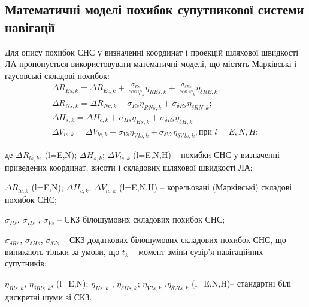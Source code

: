 \subsection{Математичні моделі похибок супутникової системи навігації}

Для опису  похибок СНС у визначенні координат і проекцій шляхової швидкості ЛА пропонується 
використовувати математичні моделі, що містять  Марківські і гаусовські складові 
похибок:
\begin{equation} \label{eq:sns_errors} 
\begin{array}{l} 
{\Delta R_{Es,k} =\Delta R_{Ec,k} +\frac{\sigma_{Rs} }{\cos \varphi_{k} } \eta_{REs,k} +\frac{\sigma_{\delta Rs} }{\cos \varphi_{k} } \eta_{\delta RE,k} ;} \\ 
{\Delta R_{Ns,k} =\Delta R_{Nc,k} +\sigma_{Rs} \eta_{RNs,k} +\sigma_{\delta Rs} \eta_{\delta RN,k} ;} \\ 
{\Delta H_{s,k} =\Delta H_{c,k} +\sigma_{Hs} \eta_{Hs,k} +\sigma_{\delta Rs} \eta_{\delta H,k} }\\ 
{\Delta V_{ls,k} =\Delta V_{lc,k} +\sigma_{Vs} \eta_{V\, ls,k} +\sigma_{\delta Vs} \eta_{\delta V\, ls,k}, \text{при } l=E,N,H;} 
\end{array} \end{equation} 

\begin{ESKDexplanation}
\item де $\Delta R_{ls,k}$, (l=E,N); $\Delta H_{s,k}$; $\Delta V_{ls,k}$ 
 (l=E,N,H) -- похибки СНС у визначенні приведених  координат, висоти і складових 
шляхової швидкості ЛА;
\item $\Delta R_{lc,k}$ (l=E,N);  $\Delta H_{c,k}$; $\Delta V_{lc,k}$ 
 (l=E,N,H) -- корельовані (Марківські) складові  похибок СНС;
\item $\sigma_{Rs} $, $\sigma_{Hs}$ , $\sigma_{Vs}$  --  СКЗ білошумових складових 
похибок СНС;
\item $\sigma_{\delta Rs} $, $\sigma_{\delta Hs} $, $\sigma_{\delta Vs} $ -- СКЗ додаткових 
білошумових складових похибок СНС, що виникають тільки за умови, що $t_{k}$ -- момент 
зміни сузір'я навігаційних супутників; 
\item $\eta_{Rls,k}$, $\eta_{\delta Rls,k}$, (l=E,N); $\eta_{Hs,k}$ 
, $\eta_{\delta Hs,k}$; $\eta_{V\, ls,k}$ ,$\eta_{\delta V\, ls,k}$ 
 (l=E,N,H)-- стандартні білі дискретні шуми зі СКЗ.
\end{ESKDexplanation}

